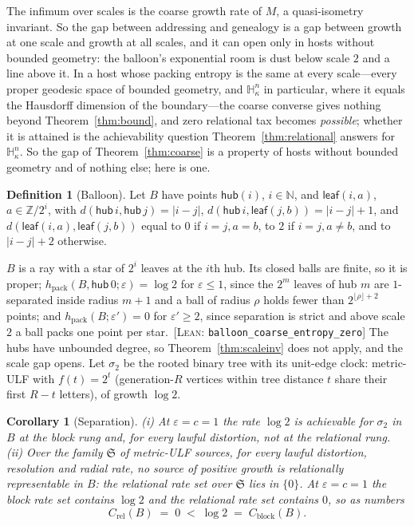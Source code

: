 \documentclass[11pt,reqno]{amsart}
\theoremstyle{plain}
\newtheorem{corollary}[theorem]{Corollary}
\theoremstyle{definition}
\newtheorem{definition}[theorem]{Definition}
\newcommand{\hpack}{h_{\mathrm{pack}}}
\newcommand{\Crel}{C_{\mathrm{rel}}}
\newcommand{\Cblock}{C_{\mathrm{block}}}
\newcommand{\Hk}{\mathbb{H}^n_\kappa}
\newcommand{\eps}{\varepsilon}
\newcommand{\cert}[1]{{\footnotesize\ [\textsc{Lean}: \texttt{#1}]}}
\begin{document}
The infimum over scales is the coarse growth rate of $M$, a quasi-isometry invariant. So the gap between addressing and genealogy is a gap between growth at one scale and growth at all scales, and it can open only in hosts without bounded geometry: the balloon's exponential room is dust below scale $2$ and a line above it. In a host whose packing entropy is the same at every scale---every proper geodesic space of bounded geometry, and $\Hk$ in particular, where it equals the Hausdorff dimension of the boundary---the coarse converse gives nothing beyond Theorem~\ref{thm:bound}, and zero relational tax becomes \emph{possible}; whether it is attained is the achievability question Theorem~\ref{thm:relational} answers for $\Hk$. So the gap of Theorem~\ref{thm:coarse} is a property of hosts without bounded geometry and of nothing else; here is one.

\begin{definition}[Balloon]
Let $B$ have points $\mathsf{hub}(i)$, $i\in\mathbb N$, and $\mathsf{leaf}(i,a)$, $a\in\mathbb Z/2^i$, with $d(\mathsf{hub}\,i,\mathsf{hub}\,j)=|i-j|$, $d(\mathsf{hub}\,i,\mathsf{leaf}(j,b))=|i-j|+1$, and $d(\mathsf{leaf}(i,a),\mathsf{leaf}(j,b))$ equal to $0$ if $i=j,a=b$, to $2$ if $i=j,a\ne b$, and to $|i-j|+2$ otherwise.
\end{definition}


$B$ is a ray with a star of $2^i$ leaves at the $i$th hub. Its closed balls are finite, so it is proper; $\hpack(B,\mathsf{hub}\,0;\eps)=\log2$ for $\eps\le1$, since the $2^m$ leaves of hub $m$ are $1$-separated inside radius $m+1$ and a ball of radius $\rho$ holds fewer than $2^{\lfloor\rho\rfloor+2}$ points; and $\hpack(B;\eps')=0$ for $\eps'\ge2$, since separation is strict and above scale $2$ a ball packs one point per star.\cert{balloon\_coarse\_entropy\_zero} The hubs have unbounded degree, so Theorem~\ref{thm:scaleinv} does not apply, and the scale gap opens. Let $\sigma_2$ be the rooted binary tree with its unit-edge clock: metric-ULF with $f(t)=2^t$ (generation-$R$ vertices within tree distance $t$ share their first $R-t$ letters), of growth $\log2$.

\begin{corollary}[Separation]\label{thm:sep}\label{thm:sepcap}
\emph{(i)} At $\eps=c=1$ the rate $\log2$ is achievable for $\sigma_2$ in $B$ at the block rung and, for every lawful distortion, not at the relational rung. \emph{(ii)} Over the family $\mathfrak S$ of metric-ULF sources, for every lawful distortion, resolution and radial rate, no source of positive growth is relationally representable in $B$: the relational rate set over $\mathfrak S$ lies in $\{0\}$. At $\eps=c=1$ the block rate set contains $\log2$ and the relational rate set contains $0$, so as numbers
\[
\Crel(B)\;=\;0\;<\;\log2\;=\;\Cblock(B).
\]
\end{corollary}
\end{document}
